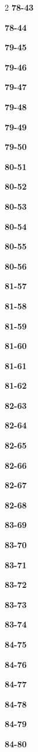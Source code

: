 \documentclass[10pt,a4paper]{article}
\begin{document}
\begin{multicols}{2}
\noindent\textbf{78-43}\ \par
\noindent\textbf{78-44}\ \par
\noindent\textbf{79-45}\ \par
\noindent\textbf{79-46}\ \par
\noindent\textbf{79-47}\ \par
\noindent\textbf{79-48}\ \par
\noindent\textbf{79-49}\ \par
\noindent\textbf{79-50}\ \par
\noindent\textbf{80-51}\ \par
\noindent\textbf{80-52}\ \par
\noindent\textbf{80-53}\ \par
\noindent\textbf{80-54}\ \par
\noindent\textbf{80-55}\ \par
\noindent\textbf{80-56}\ \par
\noindent\textbf{81-57}\ \par
\noindent\textbf{81-58}\ \par
\noindent\textbf{81-59}\ \par
\noindent\textbf{81-60}\ \par
\noindent\textbf{81-61}\ \par
\noindent\textbf{81-62}\ \par
\noindent\textbf{82-63}\ \par
\noindent\textbf{82-64}\ \par
\noindent\textbf{82-65}\ \par
\noindent\textbf{82-66}\ \par
\noindent\textbf{82-67}\ \par
\noindent\textbf{82-68}\ \par
\noindent\textbf{83-69}\ \par
\noindent\textbf{83-70}\ \par
\noindent\textbf{83-71}\ \par
\noindent\textbf{83-72}\ \par
\noindent\textbf{83-73}\ \par
\noindent\textbf{83-74}\ \par
\noindent\textbf{84-75}\ \par
\noindent\textbf{84-76}\ \par
\noindent\textbf{84-77}\ \par
\noindent\textbf{84-78}\ \par
\noindent\textbf{84-79}\ \par
\noindent\textbf{84-80}\ \par

\end{multicols}
\end{document}
